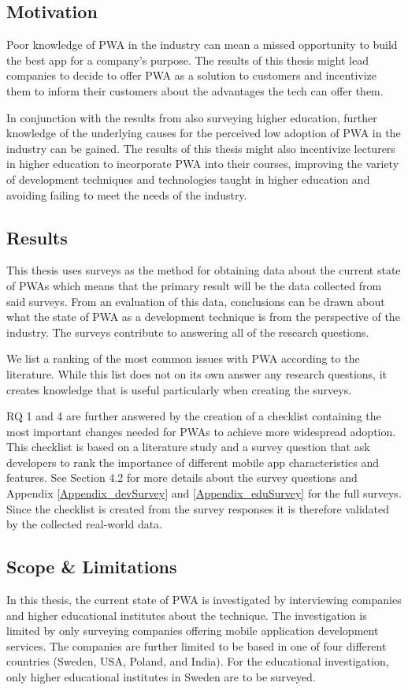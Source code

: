 \documentclass[a4paper,12pt]{article}
\begin{document}
\subsection{Motivation}
\label{Intro_motivation}
Poor knowledge of PWA in the industry can mean a missed opportunity to build the best app for a company’s purpose. The results of this thesis might lead companies to decide to offer PWA as a solution to customers and incentivize them to inform their customers about the advantages the tech can offer them.

In conjunction with the results from also surveying higher education, further knowledge of the underlying causes for the perceived low adoption of PWA in the industry can be gained. The results of this thesis might also incentivize lecturers in higher education to incorporate PWA into their courses, improving the variety of development techniques and technologies taught in higher education and avoiding failing to meet the needs of the industry.

\subsection{Results}
\label{Intro_results}
This thesis uses surveys as the method for obtaining data about the current state of PWAs which means that the primary result will be the data collected from said surveys. From an evaluation of this data, conclusions can be drawn about what the state of PWA as a development technique is from the perspective of the industry. The surveys contribute to answering all of the research questions.

We list a ranking of the most common issues with PWA according to the literature. While this list does not on its own answer any research questions, it creates knowledge that is useful particularly when creating the surveys.

RQ 1 and 4 are further answered by the creation of a checklist containing the most important changes needed for PWAs to achieve more widespread adoption. This checklist is based on a literature study and a survey question that ask developers to rank the importance of different mobile app characteristics and features. See Section 4.2 for more details about the survey questions and Appendix \ref{Appendix_devSurvey} and \ref{Appendix_eduSurvey} for the full surveys. Since the checklist is created from the survey responses it is therefore validated by the collected real-world data.

\subsection{Scope \& Limitations}
\label{Intro_scope}
In this thesis, the current state of PWA is investigated by interviewing companies and higher educational institutes about the technique. The investigation is limited by only surveying companies offering mobile application development services. The companies are further limited to be based in one of four different countries  (Sweden, USA, Poland, and India). For the educational investigation, only higher educational institutes in Sweden are to be surveyed.
\end{document}
